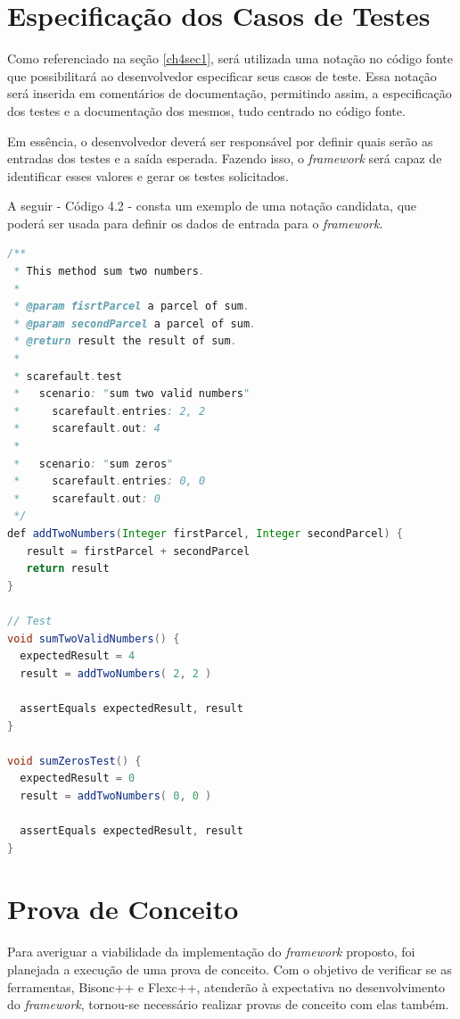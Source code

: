 \section{Especificação dos Casos de Testes}
Como referenciado na seção \ref{ch4sec1}, será utilizada uma notação no código fonte que possibilitará ao desenvolvedor especificar seus casos de teste. Essa notação será inserida em comentários de documentação, permitindo assim, a especificação dos testes e a documentação dos mesmos, tudo centrado no código fonte.
\par
\indent Em essência, o desenvolvedor deverá ser responsável por definir quais serão as entradas dos testes e a saída esperada. Fazendo isso, o \textit{framework} será capaz de identificar esses valores e gerar os testes solicitados.
\par
\indent A seguir - Código 4.2 - consta um exemplo de uma notação candidata, que poderá ser usada para definir os dados de entrada para o \textit{framework}.

\begin{lstlisting}[language=java, label=notacaoCandidata, caption={Notação Candidata}]
/**
 * This method sum two numbers.
 * 
 * @param fisrtParcel a parcel of sum.
 * @param secondParcel a parcel of sum.
 * @return result the result of sum.
 * 
 * scarefault.test
 *   scenario: "sum two valid numbers"
 *     scarefault.entries: 2, 2
 *     scarefault.out: 4
 *
 *   scenario: "sum zeros"
 *     scarefault.entries: 0, 0
 *     scarefault.out: 0
 */
def addTwoNumbers(Integer firstParcel, Integer secondParcel) {
   result = firstParcel + secondParcel
   return result
}

// Test
void sumTwoValidNumbers() {
  expectedResult = 4
  result = addTwoNumbers( 2, 2 )
  
  assertEquals expectedResult, result
}

void sumZerosTest() {
  expectedResult = 0
  result = addTwoNumbers( 0, 0 )
  
  assertEquals expectedResult, result
}
\end{lstlisting}

\section{Prova de Conceito}

Para averiguar a viabilidade da implementação do \textit{framework} proposto, foi planejada a execução de uma prova de conceito. Com o objetivo de verificar se as ferramentas, Bisonc++ e Flexc++, atenderão à expectativa no desenvolvimento do \textit{framework}, tornou-se necessário realizar provas de conceito com elas também. 

